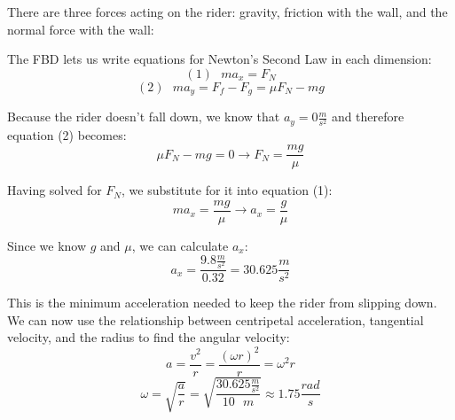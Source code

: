 \begin{Answer}[ref = gravitron]
There are three forces acting on the rider: gravity, friction with the wall, and the normal force with the wall:

\begin{center}
\end{center}

The FBD lets us write equations for Newton's Second Law in each dimension:
$$\left( 1 \right) \text{ }ma_x = F_N$$
$$\left( 2 \right) \text{ }ma_y = F_f - F_g = \mu F_N - mg$$

Because the rider doesn't fall down, we know that $a_y = 0 \frac{m}{s^2}$ and therefore equation (2) becomes:
$$\mu F_N - mg = 0 \to F_N = \frac{mg}{\mu}$$

Having solved for $F_N$, we substitute for it into equation (1):
$$ma_x = \frac{mg}{\mu} \to a_x = \frac{g}{\mu}$$

Since we know $g$ and $\mu$, we can calculate $a_x$:
$$a_x = \frac{9.8 \frac{m}{s^2}}{0.32} = 30.625 \frac{m}{s^2}$$

This is the minimum acceleration needed to keep the rider from slipping down. We can now use the relationship between centripetal acceleration, tangential velocity, and the radius to find the angular velocity:
$$a = \frac{v^2}{r} = \frac{\left( \omega r \right)^2}{r} = \omega^2 r$$
$$\omega = \sqrt{\frac{a}{r}} = \sqrt{\frac{30.625 \frac{m}{s^2}}{10 \text{ } m}} \approx 1.75 \frac{rad}{s}$$
\end{Answer}

